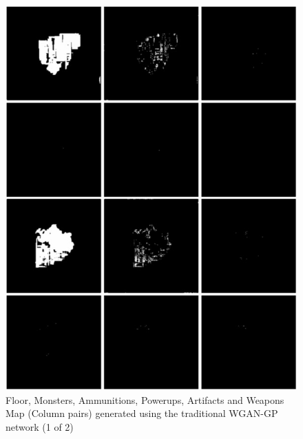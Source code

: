 \documentclass{Configuration_Files/PoliMi3i_thesis}
\begin{document}
\begin{figure}[H]
    \centering
    \includegraphics[width=1\textwidth]{wgan_sample1.jpg}
    \caption[Samples generated using the traditional WGAN-GP architecture (1 of 2)]{Floor, Monsters, Ammunitions, Powerups, Artifacts and Weapons Map 
(Column pairs) generated using the traditional WGAN-GP network (1 of 2)}
    \label{fig:wgansample1}
\end{figure}
\end{document}
